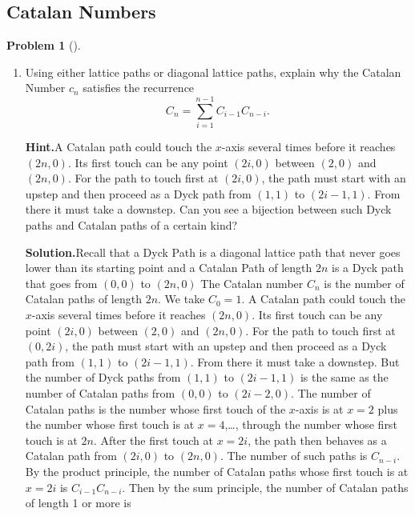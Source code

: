 \documentclass[10pt,]{book}
\theoremstyle{plain}
\theoremstyle{definition}
\newtheorem{activity}[project]{Problem}
\theoremstyle{definition}
\numberwithin{equation}{chapter}
\begin{document}
\subsection[{Catalan Numbers}]{Catalan Numbers}\label{subsection-42}
\begin{activity}[]\label{CatalanRecurrence}
\leavevmode%
\begin{enumerate}[font=\bfseries,label=(\alph*),ref=\alph*]
\item\label{task-161} Using either lattice paths or diagonal lattice paths, explain why the Catalan Number \(c_n\) satisfies the recurrence%
\begin{equation*}
C_n = \sum_{i=1}^{n-1} C_{i-1}C_{n-i}\text{.}
\end{equation*}
%
\par\medskip\noindent%
\textbf{Hint.}\quad A Catalan path could touch the \(x\)-axis several times before it reaches \((2n, 0)\).  Its first touch can be any point \((2i, 0)\) between \((2, 0)\) and \((2n, 0)\). For the path to touch first at \((2i, 0)\), the path must start with an upstep and then proceed as a Dyck path from \((1, 1)\) to \((2i - 1, 1)\). From there it must take a downstep. Can you see a bijection between such Dyck paths and Catalan paths of a certain kind?%
\par\medskip\noindent%
\textbf{Solution.}\quad Recall that a Dyck Path is a diagonal lattice path that never goes lower than its starting point and a Catalan Path of length \(2n\) is a Dyck path that goes from \((0,0)\) to \((2n,0)\) The Catalan number \(C_n\) is the number of Catalan paths of length \(2n\). We take \(C_0=1\). A Catalan path could touch the \(x\)-axis several times before it reaches \((2n,0)\). Its first touch can be any point \((2i,0)\) between \((2,0)\) and \((2n,0)\). For the path to touch first at \((0,2i)\), the path must start with an upstep and then proceed as a Dyck path from \((1,1)\) to \((2i-1,1)\). From there it must take a downstep. But the number of Dyck paths from \((1,1)\) to \((2i-1,1)\) is the same as the number of Catalan paths from \((0,0)\) to \((2i-2,0)\). The number of Catalan paths is the number whose first touch of the \(x\)-axis is at \(x=2\) plus the number whose first touch is at \(x=4\),\dots{}, through the number whose first touch is at \(2n\). After the first touch at \(x=2i\), the path then behaves as a Catalan path from \((2i,0)\) to \((2n,0)\). The number of such paths is \(C_{n-i}\). By the product principle, the number of Catalan paths whose first touch is at \(x=2i\) is \(C_{i-1}C_{n-i}\). Then by the sum principle, the number of Catalan paths of length 1 or more is%

\end{enumerate}
\end{activity}
\end{document}
